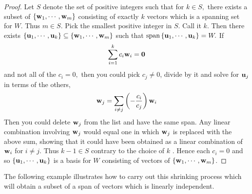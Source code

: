 \begin{proof}
Let $S$ denote the set of positive integers such that for $
k\in S,$ there exists a subset of $\left\{ {\bf w}_{1},\cdots ,{\bf w}_{m}\right\} $ consisting of exactly $k$ vectors
which is a spanning set for $W$. Thus $m\in S$. Pick the smallest positive
integer in $S$. Call it $k$. Then there exists $\left\{ {\bf u}_{1},\cdots ,
{\bf u}_{k}\right\} \subseteq \left\{ {\bf w}_{1},\cdots ,{\bf w}
_{m}\right\} $ such that $\mbox{span}\left\{ {\bf u}_{1},\cdots ,{\bf u}
_{k}\right\} =W.$ If 
\begin{equation*}
\sum_{i=1}^{k}c_{i}{\bf w}_{i}={\bf 0}
\end{equation*}
and not all of the $c_{i}=0,$ then you could pick $c_{j}\neq 0$, divide by
it and solve for ${\bf u}_{j}$ in terms of the others, 
\begin{equation*}
{\bf w}_{j}=\sum_{i\neq j}\left( -\frac{c_{i}}{c_{j}}\right) {\bf w}_{i}
\end{equation*}
Then you could delete ${\bf w}_{j}$ from the list and have the same span. Any linear combination involving ${\bf w}_{j}$ would equal one in which ${\bf w}_{j}$ is replaced with the
above sum, showing that it could have been obtained as a linear combination
of ${\bf w}_{i}$ for $i\neq j$. Thus $k-1\in S$ contrary to the choice of $k$
. Hence each $c_{i}=0$ and so $\left\{ {\bf u}_{1},\cdots ,{\bf u}
_{k}\right\} $ is a basis for $W$ consisting of vectors of $\left\{ {\bf w}
_{1},\cdots ,{\bf w}_{m}\right\} $.
\end{proof}

The following example illustrates how to carry out this shrinking process which will obtain a subset of a span
of vectors which is linearly independent.

